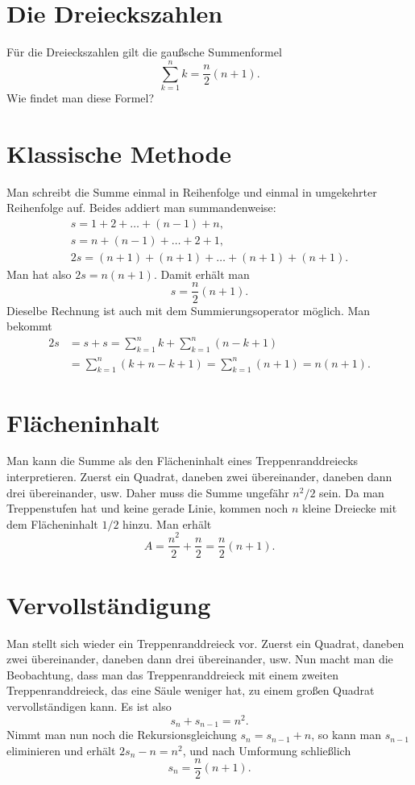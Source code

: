 \documentclass[a4paper,10pt,fleqn,twocolumn,twoside]{scrartcl}
\begin{document}
\thispagestyle{empty}

\section*{\huge Die Dreieckszahlen}

Für die Dreieckszahlen gilt die gaußsche Summenformel%
\[\sum_{k=1}^n k = \frac{n}{2}(n+1).\]
Wie findet man diese Formel?

\section{Klassische Methode}

Man schreibt die Summe einmal in Reihenfolge und einmal in
umgekehrter Reihenfolge auf. Beides addiert man summandenweise:%
\begin{gather*}
s = 1+2+\ldots+(n-1)+n,\\
s = n+(n-1)+\ldots+2+1,\\
2s = (n+1)+(n+1)+\ldots+(n+1)+(n+1).
\end{gather*}
Man hat also $2s=n(n+1)$. Damit erhält man
\[s = \frac{n}{2}(n+1).\]
Dieselbe Rechnung ist auch mit dem Summierungsoperator möglich.
Man bekommt
\begin{align*}
2s &= s + s = \sum_{k=1}^n k + \sum_{k=1}^n (n-k+1)\\
&= \sum_{k=1}^n (k+n-k+1) = \sum_{k=1}^n (n+1) = n(n+1).
\end{align*}

\section{Flächeninhalt}

Man kann die Summe als den Flächeninhalt eines Treppenranddreiecks
interpretieren. Zuerst ein Quadrat, daneben zwei übereinander,
daneben dann drei übereinander, usw.
Daher muss die Summe ungefähr $n^2/2$ sein. Da man Treppenstufen
hat und keine gerade Linie, kommen noch $n$ kleine Dreiecke mit
dem Flächeninhalt $1/2$ hinzu. Man erhält%
\[A = \frac{n^2}{2}+\frac{n}{2} = \frac{n}{2}(n+1).\]


\section{Vervollständigung}

Man stellt sich wieder ein Treppenranddreieck vor.
Zuerst ein Quadrat, daneben zwei übereinander, daneben dann drei
übereinander, usw. Nun macht man die Beobachtung, dass man das
Treppenranddreieck mit einem zweiten Treppenranddreieck, das eine
Säule weniger hat, zu einem großen Quadrat vervollständigen kann.
Es ist also%
\[s_n+s_{n-1} = n^2.\]
Nimmt man nun noch die Rekursionsgleichung $s_{n}=s_{n-1}+n$,
so kann man $s_{n-1}$ eliminieren und erhält $2s_n-n = n^2$,
und nach Umformung schließlich%
\[s_n = \frac{n}{2}(n+1).\]
\end{document}
